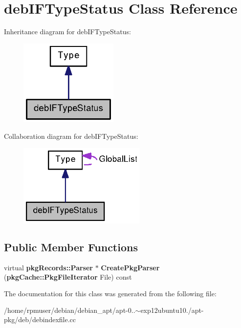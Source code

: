 \section{deb\-I\-F\-Type\-Status \-Class \-Reference}
\label{classdebIFTypeStatus}


\-Inheritance diagram for deb\-I\-F\-Type\-Status\-:
\nopagebreak
\begin{figure}[H]
\begin{center}
\leavevmode
\includegraphics[width=138pt]{classdebIFTypeStatus__inherit__graph}
\end{center}
\end{figure}


\-Collaboration diagram for deb\-I\-F\-Type\-Status\-:
\nopagebreak
\begin{figure}[H]
\begin{center}
\leavevmode
\includegraphics[width=178pt]{classdebIFTypeStatus__coll__graph}
\end{center}
\end{figure}
\subsection*{\-Public \-Member \-Functions}
\begin{DoxyCompactItemize}
\item 
virtual {\bf pkg\-Records\-::\-Parser} $\ast$ {\bfseries \-Create\-Pkg\-Parser} ({\bf pkg\-Cache\-::\-Pkg\-File\-Iterator} \-File) const \label{classdebIFTypeStatus_a5c7bfcd901abdb70ec482bc768d0d7fa}

\end{DoxyCompactItemize}


\-The documentation for this class was generated from the following file\-:\begin{DoxyCompactItemize}
\item 
/home/rpmuser/debian/debian\-\_\-apt/apt-\/0..$\sim$exp12ubuntu10./apt-\/pkg/deb/debindexfile.\-cc\end{DoxyCompactItemize}
